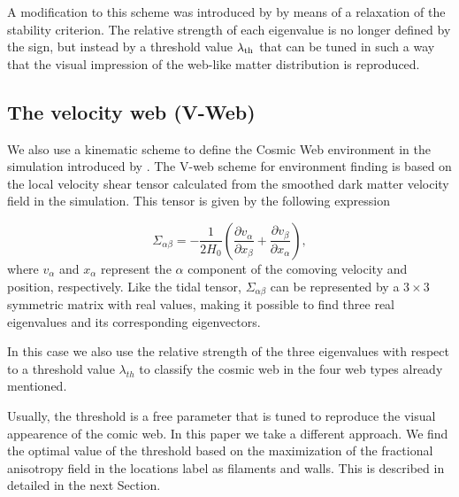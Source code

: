\documentclass[a4,useAMS,usenatbib,usegraphicx]{mn2e}
\newcommand{\pr}[1]{ \left( #1 \right) }
\newcommand{\eq}[2]{\begin{equation} \label{eq:#1} #2 \end{equation}}
\begin{document}
A modification to this scheme was introduced by \citet{Forero09}
by means of a relaxation of the stability criterion. 
The relative strength  of each eigenvalue is no longer defined by the
sign, but instead by a threshold value $\lambda_{\rm th}$ that can be
tuned in such a way that the visual impression of the web-like matter
distribution is reproduced. 
 
\subsection{The velocity web (V-Web)}
\label{subsec:Vweb}


We also use a kinematic scheme to define the Cosmic Web environment in 
the simulation introduced by \cite{Hoffman12}.
The V-web scheme for environment finding is based on the
local velocity shear tensor calculated from the smoothed dark matter 
velocity field in the simulation. This tensor is given by the 
following expression

\eq{V_web}
{	\Sigma_{\alpha\beta} = -\frac{1}{2H_0}\pr{\frac{\partial v_{\alpha}}
{\partial x_{\beta}}+\frac{\partial v_{\beta}}{\partial x_{\alpha}}},}
where $v_{\alpha}$ and $x_{\alpha}$ represent the $\alpha$ component of 
the comoving velocity and position, respectively. Like the tidal tensor, 
$\Sigma_{\alpha\beta}$ can be represented by a $3\times 3$ symmetric 
matrix with real values, making it possible to find three real
eigenvalues and its corresponding eigenvectors.

In this case we also use the relative strength of the three eigenvalues with 
respect to a threshold value $\lambda_{th}$ to classify the cosmic web
in the four web types already mentioned.

Usually, the threshold is a free parameter that is tuned to reproduce
the visual appearence of the comic web. 
In this paper we take a different approach.
We find the optimal value of the threshold based on the maximization
of the fractional anisotropy field in the locations label as filaments
and walls. 
This is described in detailed in the next Section.



\end{document}
